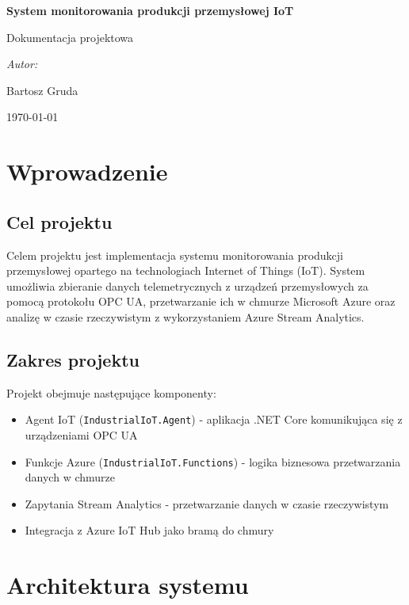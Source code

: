 \documentclass{article}
\begin{document}
\begin{titlepage}
    \centering
    \vspace*{1cm}
    {\Huge\bfseries System monitorowania produkcji przemysłowej IoT \par}
    \vspace{1.5cm}
    {\Large Dokumentacja projektowa \par}
    \vspace{2cm}
    {\LARGE\textit{Autor:} \par}
    \vspace{0.5cm}
    {\large Bartosz Gruda \par}
    \vfill
    {\large \today \par}
\end{titlepage}

\tableofcontents
\newpage

\section{Wprowadzenie}
\subsection{Cel projektu}
Celem projektu jest implementacja systemu monitorowania produkcji przemysłowej opartego na technologiach Internet of Things (IoT). System umożliwia zbieranie danych telemetrycznych z urządzeń przemysłowych za pomocą protokołu OPC UA, przetwarzanie ich w chmurze Microsoft Azure oraz analizę w czasie rzeczywistym z wykorzystaniem Azure Stream Analytics.

\subsection{Zakres projektu}
Projekt obejmuje następujące komponenty:
\begin{itemize}
    \item Agent IoT (\texttt{IndustrialIoT.Agent}) - aplikacja .NET Core komunikująca się z urządzeniami OPC UA
    \item Funkcje Azure (\texttt{IndustrialIoT.Functions}) - logika biznesowa przetwarzania danych w chmurze
    \item Zapytania Stream Analytics - przetwarzanie danych w czasie rzeczywistym
    \item Integracja z Azure IoT Hub jako bramą do chmury
\end{itemize}

\section{Architektura systemu}
\end{document}

